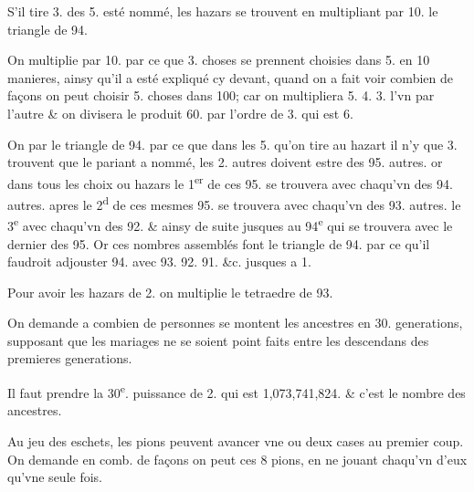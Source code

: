 \documentclass[11pt,a4paper]{article}
\begin{document}
S'il tire 3. des 5.  esté nommé, les hazars se trouvent en multipliant par 10. le triangle de 94.

On multiplie par 10. par ce que 3. choses se prennent choisies dans 5. en 10 manieres, ainsy qu'il a esté expliqué cy devant, quand on a fait voir combien de façons on peut choisir 5. choses dans 100; car on multipliera 5. 4. 3. l'vn par l'autre \& on divisera le produit 60. par l'ordre de 3. qui est 6.

On \struck{\ill{}}  par le triangle de 94. par ce que dans les 5. qu'on tire au hazart il n'y  que 3. \struck{\ill{}}  trouvent que le pariant a nommé, les 2. autres doivent estre des 95. autres. or dans tous les choix ou hazars le 1\textsuperscript{er} de ces 95. se trouvera avec chaqu'vn des 94. autres. apres le 2\textsuperscript{d} de ces mesmes 95. se trouvera avec chaqu'vn des 93. autres. le 3\textsuperscript{e} avec chaqu'vn des 92. \& ainsy de suite jusques au 94\textsuperscript{e} qui se trouvera avec le dernier des 95. Or ces nombres assemblés font le triangle de 94. par ce qu'il faudroit adjouster 94. avec 93. 92. 91. \&c. jusques a 1.

Pour avoir les hazars de 2. on multiplie  le tetraedre de 93.


On demande a combien de personnes se montent les ancestres en 30. generations, supposant que les mariages ne se soient point faits entre les descendans des premieres  generations.

Il faut prendre la 30\textsuperscript{e}. puissance de 2. qui est 1,073,741,824. \& c'est le nombre des ancestres.

Au jeu des eschets, \struck{\ill{}} les  pions peuvent avancer vne ou deux cases au premier coup. On demande en comb. de façons on peut  ces 8 pions, en ne jouant chaqu'vn d'eux qu'vne seule fois.
\end{document}
